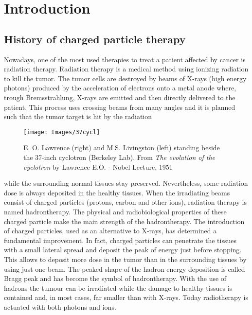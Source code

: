 \documentclass[12pt, a4paper, twoside]{book}
\begin{document}
\tableofcontents

\chapter{Introduction} %

\section{History of charged particle therapy}

Nowadays, one of the most used therapies to treat a patient affected by cancer is radiation therapy. Radiation therapy is a medical method using ionizing radiation to kill the tumor. The tumor cells are destroyed by beams of X-rays (high energy photons) produced by the acceleration of electrons onto a metal anode where, trough Bremsstrahlung, X-rays are emitted and then directly delivered to the patient. 
This process uses crossing beams from many angles and it is planned such that the tumor target is hit by the radiation
\begin{wrapfigure}{r}{.5\textwidth}
\centering
{\texttt{[image: Images/37cycl]}}
\caption{E. O. Lawrence (right) and M.S. Livingston (left) standing beside the 37-inch
cyclotron (Berkeley Lab). From \emph{The evolution of the cyclotron} by Lawrence E.O. -
Nobel Lecture, 1951}
\label{fig:37cycl}
\vspace{-5mm}
\end{wrapfigure}
\noindent while the surrounding normal tissues stay preserved. Nevertheless, some radiation dose is always deposited in the healthy tissues.
When the irradiating beams consist of charged particles (protons, carbon and other ions), radiation therapy is named hadrontherapy. The physical and radiobiological properties of these charged particle make the main strength of the hadrontherapy.
The introduction of charged particles, used as an alternative to X-rays, has determined a fundamental improvement. In fact, charged particles can penetrate the tissues with a small lateral spread and deposit the peak of energy just before stopping. This allows to deposit more dose in the tumor than in the surrounding tissues by using just one beam.
The peaked shape of the hadron energy deposition is called Bragg peak and has become the symbol of hadrontherapy. With the use of hadrons the tumour can be irradiated while the damage to healthy tissues is contained and, in most cases, far smaller than with X-rays. Today radiotherapy is actuated with both photons and ions.
\end{document}
